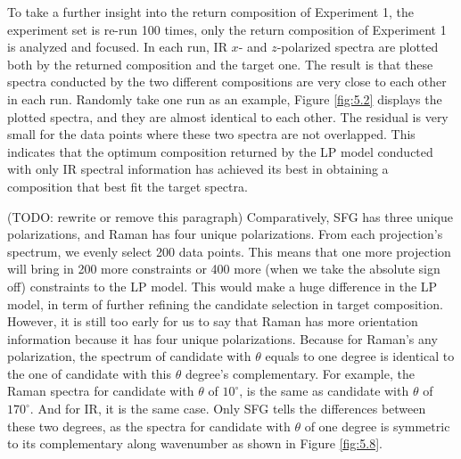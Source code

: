 To take a further insight into the return composition of Experiment 1, the experiment set is re-run 100 times, only the return composition of Experiment 1 is analyzed and focused. In each run, IR $x$- and $z$-polarized spectra are plotted both by the returned composition and the target one. The result is that these spectra conducted by the two different compositions are very close to each other in each run. Randomly take one run as an example, Figure \ref{fig:5.2} displays the plotted spectra, and they are almost identical to each other. The residual is very small for the data points where these two spectra are not overlapped. This indicates that the optimum composition returned by the LP model conducted with only IR spectral information has achieved its best in obtaining a composition that best fit the target spectra. 

(TODO: rewrite or remove this paragraph) Comparatively, SFG has three unique polarizations, and Raman has four unique polarizations. From each projection's spectrum, we evenly select 200 data points. This means that one more projection will bring in 200 more constraints or 400 more (when we take the absolute sign off) constraints to the LP model. This would make a huge difference in the LP model, in term of further refining the candidate selection in target composition. However, it is still too early for us to say that Raman has more orientation information because it has four unique polarizations. Because for Raman's any polarization, the spectrum of candidate with $\theta$ equals to one degree is identical to the one of candidate with this $\theta$ degree's complementary. For example, the Raman spectra for candidate with $\theta$ of $10^{\circ}$, is the same as candidate with $\theta$ of $170^{\circ}$. And for IR, it is the same case. Only SFG tells the differences between these two degrees, as the spectra for candidate with $\theta$ of one degree is symmetric to its complementary along wavenumber as shown in Figure \ref{fig:5.8}. \\

